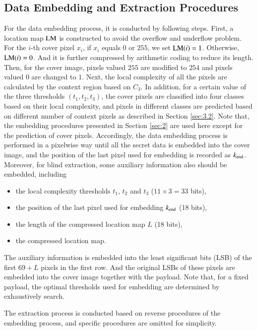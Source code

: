 \documentclass[review,3p,10pt,sort&compress]{elsarticle}
\begin{document}
\subsection{Data Embedding and Extraction Procedures}\label{sec:3.3}
For the data embedding process, it is conducted by following steps. First, a location map $ \rm LM$ is constructed to avoid the overflow and underflow problem. For the $i$-th cover pixel $x_i$, if $x_i$ equals 0 or $255$, we set ${\rm LM}(i) = 1$. Otherwise, ${\rm LM}(i) = 0$. And it is further compressed by arithmetic coding to reduce its length. Then, for the cover image, pixels valued $255$ are modified to $254$ and pixels valued $0$ are changed to $1$. Next, the local complexity of all the pixels are calculated by the context region based on $C_3$. In addition, for a certain value of the three thresholds $(t_1, t_2, t_3)$, the cover pixels are classified into four classes based on their local complexity, and pixels in different classes are predicted based on different number of context pixels as described in Section \ref{sec:3.2}. Note that, the embedding procedures presented in Section \ref{sec:2} are used here except for the prediction of cover pixels. Accordingly, the data embedding process is performed in a pixelwise way until all the secret data is embedded into the cover image, and the position of the last pixel used for embedding is recorded as $k_{\rm end}$. Moreover, for blind extraction, some auxiliary information also should be embedded, including
\begin{itemize}
  \item the local complexity thresholds $t_1$, $t_2$ and $t_3$ ($11 \times 3 = 33$ bits),
  \item the position of the last pixel used for embedding $k_{\rm end}$ (18 bits),
  \item the length of the compressed location map $L$ (18 bits),
  \item the compressed location map.
\end{itemize}
The auxiliary information is embedded into the least significant bits (LSB) of the first $69 + L$ pixels in the first row. And the original LSBs of these pixels are embedded into the cover image together with the payload.
Note that, for a fixed payload, the optimal thresholds used for embedding are determined by exhaustively search.

The extraction process is conducted based on reverse procedures of the embedding process, and specific procedures are omitted for simplicity.
\end{document}
